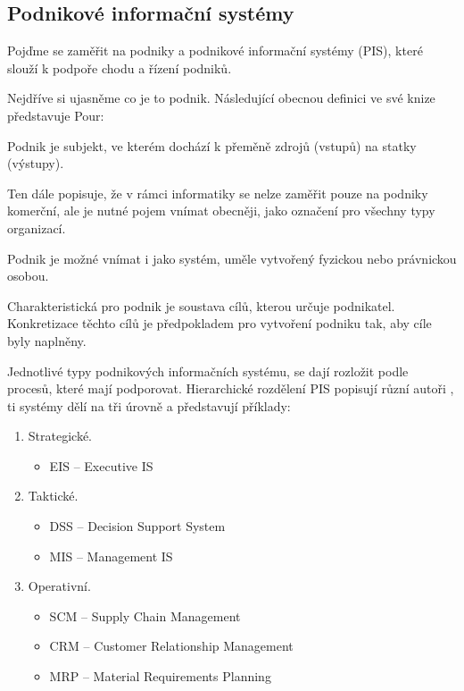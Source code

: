 \subsection{Podnikové informační systémy}
Pojďme se zaměřit na podniky a podnikové informační systémy (PIS), které slouží k podpoře chodu a řízení podniků. \cite{Tvrdikova2008}

Nejdříve si ujasněme co je to podnik. Následující obecnou definici ve své knize představuje Pour:
\begin{definition}
Podnik je subjekt, ve kterém dochází k přeměně zdrojů (vstupů) na statky (výstupy). \cite{Pour2015}
\end{definition}

Ten dále popisuje, že v rámci informatiky se nelze zaměřit pouze na podniky komerční, ale je nutné pojem vnímat obecněji, jako označení pro všechny typy organizací.

Podnik je možné vnímat i jako systém, uměle vytvořený fyzickou nebo právnickou osobou. 

Charakteristická pro podnik je soustava cílů, kterou určuje podnikatel. Konkretizace těchto cílů je předpokladem pro vytvoření podniku tak, aby cíle byly naplněny. \cite{Pour2015}

Jednotlivé typy podnikových informačních systému, se dají rozložit podle procesů, které mají podporovat. Hierarchické rozdělení PIS popisují různí autoři \cite{Tvrdikova2008}\cite{Vymetal2009}\cite{Basl2012}, ti systémy dělí na tři úrovně a představují příklady:

\begin{enumerate}
    \item Strategické.
    \begin{itemize}
        \item EIS -- Executive IS
    \end{itemize}
    \item Taktické.
    \begin{itemize}
        \item DSS -- Decision Support System
        \item MIS -- Management IS
    \end{itemize}
    \item Operativní.
    \begin{itemize}
        \item SCM -- Supply Chain Management
        \item CRM -- Customer Relationship Management
        \item MRP -- Material Requirements Planning
    \end{itemize}
\end{enumerate}

